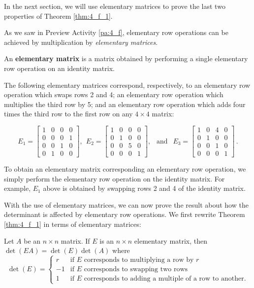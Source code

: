 In the next section, we will use elementary matrices to prove the last two properties of Theorem \ref{thm:4_f_1}. 


As we saw in Preview Activity \ref{pa:4_f}, elementary row operations can be achieved by multiplication by \emph{elementary matrices}.

\begin{definition} An \textbf{elementary matrix} is a matrix obtained by performing a single elementary row operation on an identity matrix.
\end{definition}



The following elementary matrices correspond, respectively, to an elementary row operation which swaps rows 2 and 4; an elementary row operation which multiplies the third row by 5; and an elementary row operation which adds four times the third row to the first row on any $4\times 4$ matrix:

\[ E_1 = \left[ \begin{array}{cccc} 1&0&0&0\\0&0&0&1\\0&0&1&0\\ 0&1&0&0 \end{array} \right], \ \ E_2 = \left[ \begin{array}{cccc} 1&0&0&0\\0&1&0&0\\0&0&5&0 \\ 0&0&0&1 \end{array} \right], \ \ \text{ and } \ \ E_3 = \left[ \begin{array}{cccc} 1&0&4&0\\0&1&0&0\\0&0&1&0\\0&0&0&1 \end{array} \right]\,.\]

To obtain an elementary matrix corresponding an elementary row operation, we simply perform the elementary row operation on the identity matrix. For example, $E_1$ above is obtained by swapping rows 2 and 4 of the identity matrix.



With the use of elementary matrices, we can now prove the result about how the determinant is affected by elementary row operations. We first rewrite Theorem \ref{thm:4_f_1} in terms of elementary matrices:

\begin{theorem} \label{thm:4_f_2} Let $A$ be an $n\times n$ matrix. If $E$ is an $n\times n$ elementary matrix, then $\det(EA)=\det(E)\det(A)$ where
\[ \det(E) = \left\{ \begin{array}{rl} r & \text{if $E$ corresponds to multiplying a row by $r$} \\ -1& \text{if $E$ corresponds to swapping two rows} \\ 1 & \text{if $E$ corresponds to adding a multiple of a row to another.} \end{array} \right. \]
\end{theorem}



